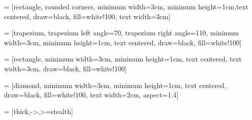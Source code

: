 \newcommand\nodebg{white!100}

 = [rectangle, rounded corners, minimum width=3cm, minimum height=1cm,text centered, draw=black, fill=\nodebg, text width=3cm]

 = [trapezium, trapezium left angle=70, trapezium right angle=110, minimum width=3cm, minimum height=1cm, text centered, draw=black, fill=\nodebg]

 = [rectangle, minimum width=3cm, minimum height=1cm, text centered, text width=3cm, draw=black, fill=\nodebg]

 = [diamond, minimum width=3cm, minimum height=1cm, text centered, draw=black, fill=\nodebg, text width=2cm, aspect=1.4]

 = [thick,->,>=stealth]


